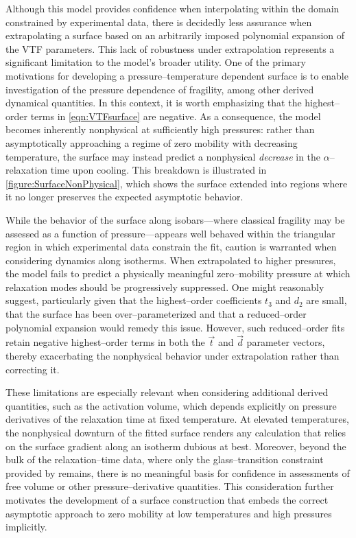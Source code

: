 Although this model provides confidence when interpolating within the domain constrained by experimental data, there is decidedly less assurance when extrapolating a surface based on an arbitrarily imposed polynomial expansion of the VTF parameters. This lack of robustness under extrapolation represents a significant limitation to the model’s broader utility. One of the primary motivations for developing a pressure--temperature dependent surface is to enable investigation of the pressure dependence of fragility, among other derived dynamical quantities. In this context, it is worth emphasizing that the highest--order terms in \eqn\ref{eqn:VTFsurface} are negative. As a consequence, the model becomes inherently nonphysical at sufficiently high pressures: rather than asymptotically approaching a regime of zero mobility with decreasing temperature, the surface may instead predict a nonphysical \emph{decrease} in the $\alpha$--relaxation time upon cooling. This breakdown is illustrated in \fig \ref{figure:SurfaceNonPhysical}, which shows the surface extended into regions where it no longer preserves the expected asymptotic behavior.

While the behavior of the surface along isobars—where classical fragility may be assessed as a function of pressure—appears well behaved within the triangular region in which experimental data constrain the fit, caution is warranted when considering dynamics along isotherms. When extrapolated to higher pressures, the model fails to predict a physically meaningful zero--mobility pressure at which relaxation modes should be progressively suppressed. One might reasonably suggest, particularly given that the highest--order coefficients $t_{3}$ and $d_{2}$ are small, that the surface has been over--parameterized and that a reduced--order polynomial expansion would remedy this issue. However, such reduced--order fits retain negative highest--order terms in both the $\vec{t}$ and $\vec{d}$ parameter vectors, thereby exacerbating the nonphysical behavior under extrapolation rather than correcting it.

These limitations are especially relevant when considering additional derived quantities, such as the activation volume, which depends explicitly on pressure derivatives of the relaxation time at fixed temperature. At elevated temperatures, the nonphysical downturn of the fitted surface renders any calculation that relies on the surface gradient along an isotherm dubious at best. Moreover, beyond the bulk of the relaxation--time data, where only the glass--transition constraint provided by \tgp remains, there is no meaningful basis for confidence in assessments of free volume or other pressure--derivative quantities. This consideration further motivates the development of a surface construction that embeds the correct asymptotic approach to zero mobility at low temperatures and high pressures implicitly.

